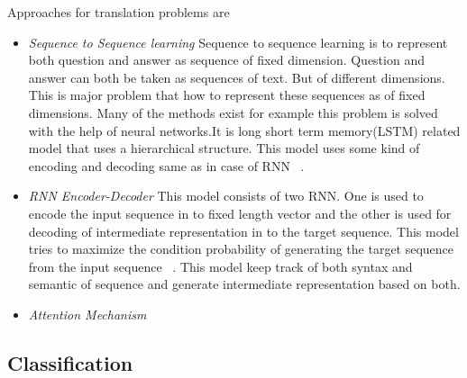 \documentclass{doublecol-new}
\theoremstyle{TH}{
\newtheorem{lemma}{Lemma}
\newtheorem{theorem}[lemma]{Theorem}
\newtheorem{corrolary}[lemma]{Corrolary}
\newtheorem{conjecture}[lemma]{Conjecture}
\newtheorem{proposition}[lemma]{Proposition}
\newtheorem{claim}[lemma]{Claim}
\newtheorem{stheorem}[lemma]{Wrong Theorem}
\newtheorem{algorithm}{Algorithm}
}
\theoremstyle{THrm}{
\newtheorem{definition}{Definition}[section]
\newtheorem{question}{Question}[section]
\newtheorem{remark}{Remark}
\newtheorem{scheme}{Scheme}
}
\theoremstyle{THhit}{
\newtheorem{case}{Case}[section]
}
\begin{document}
Approaches for translation problems are 

\begin{itemize}
	\item {\em Sequence to Sequence learning} Sequence to sequence learning is to represent both question and answer as sequence of fixed dimension. Question and answer can both be taken as sequences of text. But of different dimensions. This is major problem that how to represent these sequences as of fixed dimensions. Many of the methods exist for example this problem is solved with the help of neural networks.It is long short term memory(LSTM) related model that uses a hierarchical structure. This model uses some kind of encoding and decoding same as in case of RNN ~\cite{sutskever2014sequence}. 
	\item {\em RNN Encoder-Decoder} This model consists of two RNN. One is used to encode the input sequence in to fixed length vector and the other is used for decoding of intermediate representation in to the target sequence. This model tries to maximize the condition probability of generating the target sequence from the input sequence ~\cite{cho2014learning}. This model keep track of both syntax and semantic of sequence and generate intermediate representation based on both.  
	\item {\em Attention Mechanism}
\end{itemize}

\subsection{Classification}
\end{document}

